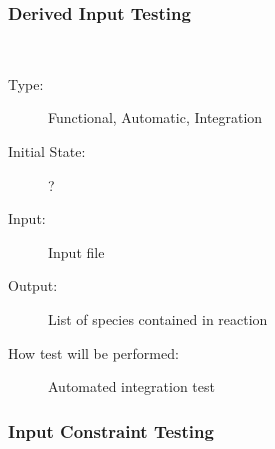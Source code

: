 \documentclass[12pt, titlepage]{article}
\newcounter{testnum} %
\begin{document}
\subsubsection{Derived Input Testing}

\begin{addmargin}[2em]{0em}
\\
\begin{addmargin}[2em]{0em}
\begin{description}
\item[Type:] Functional, Automatic, Integration
					
\item[Initial State:] ?
					
\item[Input:] Input file
					
\item[Output:] List of species contained in reaction
					
\item[How test will be performed:] Automated integration test\\
\end{description}
\end{addmargin}
\end{addmargin}

\subsubsection{Input Constraint Testing}
\end{document}
